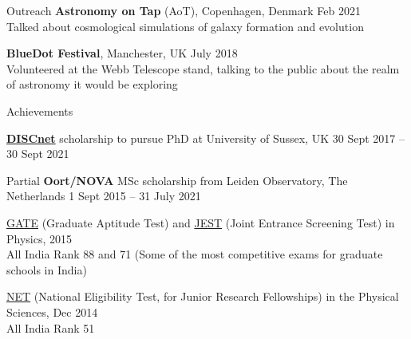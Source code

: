 \documentclass[a4paper,10pt]{resume} %
\begin{document}

\begin{rSection}{Outreach}
	{\textbf{Astronomy on Tap} (AoT), Copenhagen, Denmark} \hfill {Feb 2021}
	\\
	{Talked about cosmological simulations of galaxy formation and evolution}
	
	{\textbf{BlueDot Festival}, Manchester, UK} \hfill {July 2018}
	\\
	{Volunteered at the Webb Telescope stand, talking to the public about the realm of astronomy it would be exploring}
\end{rSection}



\begin{rSection}{Achievements}

{\textbf{\href{https://www.discnet.sussex.ac.uk/}{DISCnet}} scholarship to pursue PhD at University of Sussex, UK} \hfill {30 Sept 2017 -- 30 Sept 2021}

{Partial \textbf{Oort/NOVA} MSc scholarship from Leiden Observatory, The Netherlands} \hfill {1 Sept 2015 -- 31 July 2021}

{\href{https://en.wikipedia.org/wiki/Graduate_Aptitude_Test_in_Engineering}{\color{blue}GATE} (Graduate Aptitude Test) and \href{https://en.wikipedia.org/wiki/Joint_Entrance_Screening_Test}{\color{blue}JEST} (Joint Entrance Screening Test) in Physics,} \hfill {2015}\\
All India Rank 88 and 71 (Some of the most competitive exams for graduate schools in India)

{\href{https://en.wikipedia.org/wiki/National_Eligibility_Test}{\color{blue}NET} (National Eligibility Test, for Junior Research Fellowships) in the Physical Sciences,} \hfill {Dec 2014}\\
All India Rank 51
\end{rSection}

\end{document}
